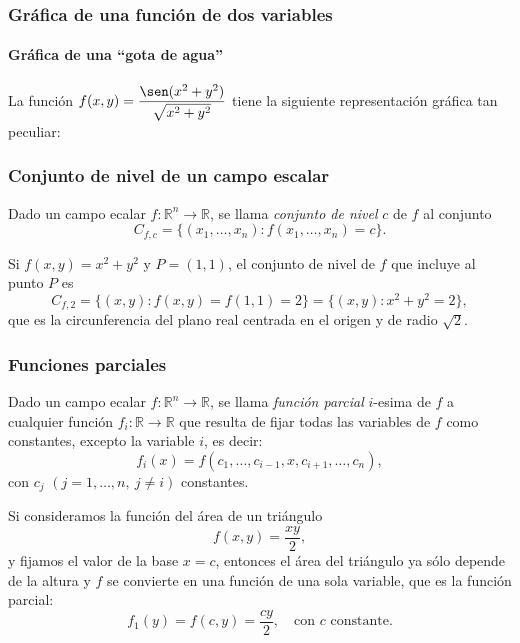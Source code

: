\begin{frame}
\frametitle{Gráfica de una función de dos variables}
\framesubtitle{Gráfica de una ``gota de agua''}
La función $\displaystyle f(x,y)=\frac{\sen(x^2+y^2)}{\sqrt{x^2+y^2}}$ tiene la siguiente representación gráfica tan
peculiar:
\begin{center}
\scalebox{1}{}
\end{center}
\end{frame}


\begin{frame}
\frametitle{Conjunto de nivel de un campo escalar}
\begin{definicion}
Dado un campo ecalar $f:\mathbb{R}^n\rightarrow \mathbb{R}$, se llama \emph{conjunto de nivel} $c$ de $f$ al conjunto
\[
C_{f,c}=\{(x_1,\ldots,x_n): f(x_1,\ldots,x_n)=c\}.
\]
\end{definicion}
Si $f(x,y)=x^2+y^2$ y $P=(1,1)$, el conjunto de nivel de $f$ que incluye al punto $P$ es
\[
C_{f,2} = \{(x,y): f(x,y)=f(1,1)=2\} = \{(x,y): x^2+y^2=2\},
\] 
que es la circunferencia del plano real centrada en el origen y de radio $\sqrt{2}$.
\begin{center}
\scalebox{0.8}{}
\end{center}
\end{frame}


\begin{frame}
\frametitle{Funciones parciales}
\begin{definicion}
Dado un campo ecalar $f:\mathbb{R}^n\rightarrow \mathbb{R}$, se llama \emph{función parcial} $i$-esima de $f$ a
cualquier función $f_i:\mathbb{R}\rightarrow \mathbb{R}$ que resulta de fijar todas las variables de $f$ como
constantes, excepto la variable $i$, es decir:
\[
f_i(x)=f(c_1,\ldots,c_{i-1},x,c_{i+1},\ldots,c_{n}),
\]
con $c_j$ $(j=1,\ldots, n,\ j\neq i)$ constantes. 
\end{definicion}
 
Si consideramos la función del área de un triángulo 
\[f(x,y)=\frac{xy}{2},\]
y fijamos el valor de la base $x=c$, entonces el área del triángulo ya sólo depende de la altura y $f$ se convierte en
una función de una sola variable, que es la función parcial:
\[
f_1(y)=f(c,y)=\frac{cy}{2},\quad \mbox{con $c$ constante}.
\]
\end{frame}



